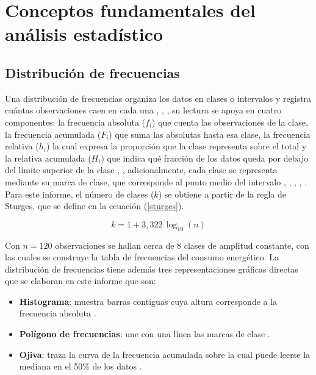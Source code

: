 \section{Conceptos fundamentales del análisis estadístico}
    \subsection{Distribución de frecuencias}
        Una distribución de frecuencias organiza los datos en clases o intervalos y
        registra cuántas observaciones caen en cada una \cite{triola2018estadistica},
        \cite{walpole2012probabilidad}, \cite{sturges1926choice}, su lectura se apoya
        en cuatro componentes: la frecuencia absoluta ($f_{i}$) que cuenta las
        observaciones de la clase, la frecuencia acumulada ($F_{i}$) que suma las
        absolutas hasta esa clase, la frecuencia relativa ($h_{i}$) la cual expresa la
        proporción que la clase representa sobre el total y la relativa acumulada
        ($H_{i}$) que indica qué fracción de los datos queda por debajo del límite
        superior de la clase \cite{triola2018estadistica},
        \cite{walpole2012probabilidad}, adicionalmente, cada clase se representa
        mediante su marca de clase, que corresponde al punto medio del intervalo
        \cite{triola2018estadistica}, \cite{walpole2012probabilidad},
        \cite{sturges1926choice}, \cite{few2012show}, \cite{castro2026visualizacion}.
        Para este informe, el número de clases ($k$) se obtiene a partir de la regla de
        Sturges, que se define en la ecuación (\ref{sturges}).

        \begin{equation}
            k = 1 + 3{,}322 \, \log_{10}(n)
            \label{sturges}
        \end{equation}

        Con $n = 120$ observaciones se hallan cerca de 8 clases de amplitud constante,
        con las cuales se construye la tabla de frecuencias del consumo energético. La
        distribución de frecuencias tiene además tres representaciones gráficas directas
        que se elaboran en este informe que son:

        \vspace{10pt}

        \begin{itemize}
            \item \textbf{Histograma}: muestra barras contiguas cuya altura corresponde
            a la frecuencia absoluta \cite{castro2026visualizacion}.

            \item \textbf{Polígono de frecuencias}: une con una línea las marcas de
            clase \cite{castro2026visualizacion}.

            \item \textbf{Ojiva}: traza la curva de la frecuencia acumulada sobre la
            cual puede leerse la mediana en el 50\% de los datos
            \cite{castro2026visualizacion}.
        \end{itemize}

